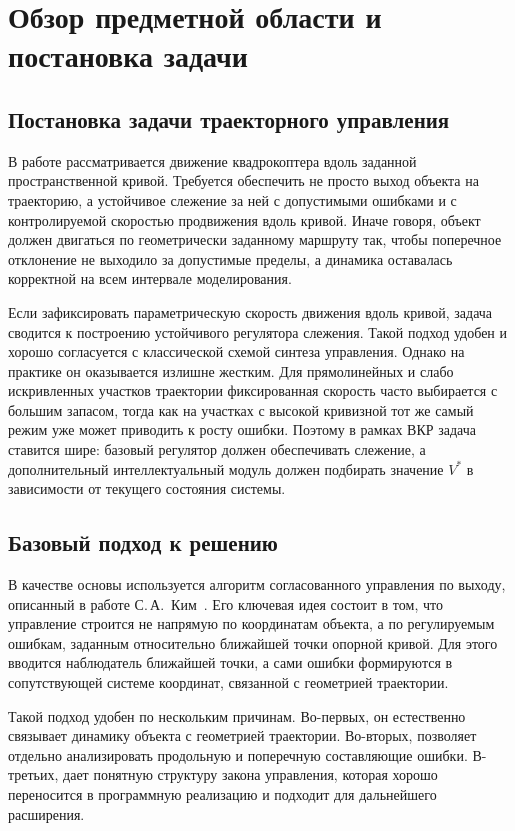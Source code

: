 \chapter{Обзор предметной области и постановка задачи}

\section{Постановка задачи траекторного управления}

В работе рассматривается движение квадрокоптера вдоль заданной пространственной кривой. Требуется обеспечить не просто выход объекта на траекторию, а устойчивое слежение за ней с допустимыми ошибками и с контролируемой скоростью продвижения вдоль кривой. Иначе говоря, объект должен двигаться по геометрически заданному маршруту так, чтобы поперечное отклонение не выходило за допустимые пределы, а динамика оставалась корректной на всем интервале моделирования.

Если зафиксировать параметрическую скорость движения вдоль кривой, задача сводится к построению устойчивого регулятора слежения. Такой подход удобен и хорошо согласуется с классической схемой синтеза управления. Однако на практике он оказывается излишне жестким. Для прямолинейных и слабо искривленных участков траектории фиксированная скорость часто выбирается с большим запасом, тогда как на участках с высокой кривизной тот же самый режим уже может приводить к росту ошибки. Поэтому в рамках ВКР задача ставится шире: базовый регулятор должен обеспечивать слежение, а дополнительный интеллектуальный модуль должен подбирать значение $V^{\ast}$ в зависимости от текущего состояния системы.

\section{Базовый подход к решению}

В качестве основы используется алгоритм согласованного управления по выходу, описанный в работе С.\,А.~Ким~\cite{kim_algorithms}. Его ключевая идея состоит в том, что управление строится не напрямую по координатам объекта, а по регулируемым ошибкам, заданным относительно ближайшей точки опорной кривой. Для этого вводится наблюдатель ближайшей точки, а сами ошибки формируются в сопутствующей системе координат, связанной с геометрией траектории.

Такой подход удобен по нескольким причинам. Во-первых, он естественно связывает динамику объекта с геометрией траектории. Во-вторых, позволяет отдельно анализировать продольную и поперечную составляющие ошибки. В-третьих, дает понятную структуру закона управления, которая хорошо переносится в программную реализацию и подходит для дальнейшего расширения.

